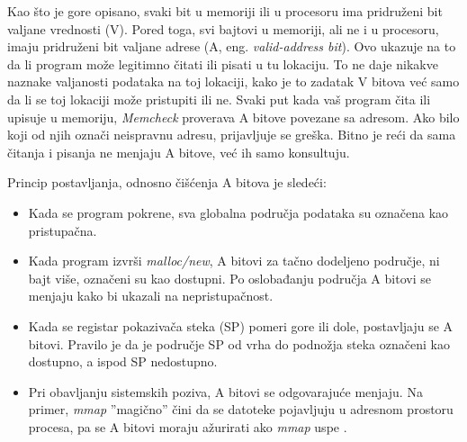 \documentclass[12pt,oneside]{memoir}
\theoremstyle{plain}
\theoremstyle{definition}
\begin{document}
Kao što je gore opisano, svaki bit u memoriji ili u procesoru ima pridruženi bit valjane vrednosti (V). Pored toga, svi bajtovi u memoriji, ali ne i u procesoru, imaju pridruženi bit valjane adrese (A, eng. \textit{valid-address bit}). Ovo ukazuje na to da li program može legitimno čitati ili pisati u tu lokaciju. To ne daje nikakve naznake valjanosti podataka na toj lokaciji, kako je to zadatak V bitova već samo da li se toj lokaciji može pristupiti ili ne. Svaki put kada vaš program čita ili upisuje u memoriju, \textit{Memcheck} proverava A bitove povezane sa adresom. Ako bilo koji od njih označi neispravnu adresu, prijavljuje se greška. Bitno je reći da sama čitanja i pisanja ne menjaju A bitove, već ih samo konsultuju.

Princip postavljanja, odnosno čišćenja A bitova je sledeći:
\begin{itemize}
\item Kada se program pokrene, sva globalna područja podataka su označena kao pristupačna.
\item Kada program izvrši \textit{malloc/new}, A bitovi za tačno dodeljeno područje, ni bajt više, označeni su kao dostupni. Po oslobađanju područja A bitovi se menjaju kako bi ukazali na nepristupačnost.
\item Kada se registar pokazivača steka (SP) pomeri gore ili dole, postavljaju se A bitovi. Pravilo je da je područje SP od vrha do podnožja steka označeni kao dostupno, a ispod SP nedostupno. 
\item Pri obavljanju sistemskih poziva, A bitovi se odgovarajuće menjaju. Na primer, \textit{mmap} ''magično'' čini da se datoteke pojavljuju u adresnom prostoru procesa, pa se A bitovi moraju ažurirati ako \textit{mmap} uspe \cite{Memcheck}. 
\end{itemize}
\end{document}
